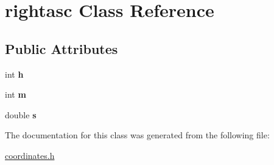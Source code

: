 \hypertarget{structrightasc}{}\section{rightasc Class Reference}
\label{structrightasc}
\subsection*{Public Attributes}
\begin{DoxyCompactItemize}
\item 
\mbox{\label{structrightasc_afe7e0b81c9771b519db47a8465964389}} 
int {\bfseries h}
\item 
\mbox{\label{structrightasc_a5a5c429c48f61afb90144babf5fd4eb7}} 
int {\bfseries m}
\item 
\mbox{\label{structrightasc_a086aa1fe5d23213e702bc5ad3cc190f0}} 
double {\bfseries s}
\end{DoxyCompactItemize}


The documentation for this class was generated from the following file\+:\begin{DoxyCompactItemize}
\item 
\mbox{\hyperlink{coordinates_8h}{coordinates.\+h}}\end{DoxyCompactItemize}
